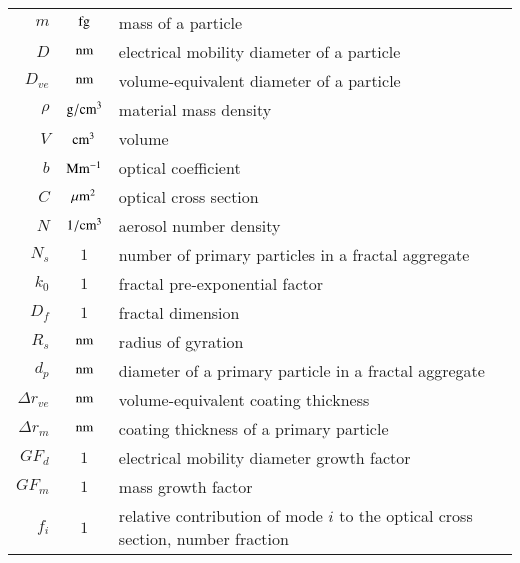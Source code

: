 \begin{tabular}{r c l}
    $m$ & $\rm fg$ & mass of a particle\\
    $D$ & $\rm nm$ & electrical mobility diameter of a particle\\
    $D_{ve}$ & $\rm nm$ & volume-equivalent diameter of a particle\\
    $\rho$ & $\rm g/cm^3$ & material mass density\\
    $V$ & $\rm cm^3$ & volume\\
    $b$ & $\rm Mm^{-1}$ & optical coefficient\\
    $C$ & $\rm \mu m^2$ & optical cross section\\
    $N$ & $\rm 1/cm^3$ & aerosol number density\\
    $N_s$ & $1$ & number of primary particles in a fractal aggregate\\
    $k_0$ & $1$ & fractal pre-exponential factor\\
    $D_f$ & $1$ & fractal dimension\\
    $R_s$ & $\rm nm$ & radius of gyration\\
    $d_p$ & $\rm nm$ & diameter of a primary particle in a fractal aggregate\\
    $\Delta r_{ve}$ & $\rm nm$ & volume-equivalent coating thickness\\
    $\Delta r_m$ & $\rm nm$& coating thickness of a primary particle\\
    $GF_{d}$ & $1$ & electrical mobility diameter growth factor\\
    $GF_{m}$ & $1$ & mass growth factor\\
    $f_i$ & $1$ & relative contribution of mode $i$ to the optical cross section, number fraction\\
\end{tabular}
